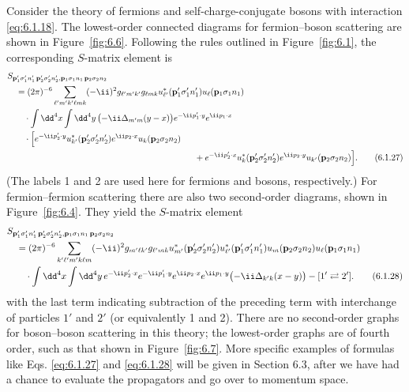 Consider the theory of fermions and self-charge-conjugate bosons with
interaction \eqref{eq:6.1.18}. The lowest-order connected diagrams for fermion--boson
scattering are shown in Figure~\ref{fig:6.6}. Following the rules outlined in Figure~\ref{fig:6.1},
the corresponding $S$-matrix element is
\begin{align}
&S_{\mathbf p'_1\sigma'_1n'_1\,\mathbf p'_2\sigma'_2n'_2,
       \mathbf p_1\sigma_1n_1\,\mathbf p_2\sigma_2n_2}
\notag\\
&\quad=(2\pi)^{-6}\sum_{\ell'm'k'\ell m k}
 (-\ii)^2 g_{\ell'm'k'}g_{\ell m k}
 u_{\ell'}^*(\mathbf p'_1\sigma'_1n'_1)
 u_\ell(\mathbf p_1\sigma_1n_1)
\notag\\
&\qquad\cdot\int \dd^4x\int \dd^4y\,
 \bigl(-\ii\Delta_{m'm}(y-x)\bigr)
 e^{-\ii p'_1\cdot y}e^{\ii p_1\cdot x}
\notag\\
&\qquad\cdot\Bigl[
 e^{-\ii p'_2\cdot y}u_{k'}^*(\mathbf p'_2\sigma'_2n'_2)
 e^{\ii p_2\cdot x}u_k(\mathbf p_2\sigma_2n_2)
\notag\\
&\hspace{77mm}+
 e^{-\ii p'_2\cdot x}u_k^*(\mathbf p'_2\sigma'_2n'_2)
 e^{\ii p_2\cdot y}u_{k'}(\mathbf p_2\sigma_2n_2)
 \Bigr].
\tag{6.1.27}
\label{eq:6.1.27}
\end{align}
(The labels 1 and 2 are used here for fermions and bosons, respectively.) For
fermion--fermion scattering there are also two second-order diagrams, shown in
Figure~\ref{fig:6.4}. They yield the $S$-matrix element
\begin{align}
&S_{\mathbf p'_1\sigma'_1n'_1\,\mathbf p'_2\sigma'_2n'_2,
       \mathbf p_1\sigma_1n_1\,\mathbf p_2\sigma_2n_2}
\notag\\
&\quad=(2\pi)^{-6}\sum_{k'\ell'm'k\ell m}
 (-\ii)^2g_{m'\ell k'}g_{\ell'mk}
 u_{m'}^*(\mathbf p'_2\sigma'_2n'_2)
 u_{\ell'}^*(\mathbf p'_1\sigma'_1n'_1)
 u_m(\mathbf p_2\sigma_2n_2)u_\ell(\mathbf p_1\sigma_1n_1)
\notag\\
&\qquad\cdot\int \dd^4x\int \dd^4y\,
 e^{-\ii p'_2\cdot x}e^{-\ii p'_1\cdot y}
 e^{\ii p_2\cdot x}e^{\ii p_1\cdot y}
 \bigl(-\ii\Delta_{k'k}(x-y)\bigr)
 -[1'\rightleftarrows2'].
\tag{6.1.28}
\label{eq:6.1.28}
\end{align}
with the last term indicating subtraction of the preceding term with
interchange of particles $1'$ and $2'$ (or equivalently 1 and 2). There are no
second-order graphs for boson--boson scattering in this theory; the
lowest-order graphs are of fourth order, such as that shown in Figure~\ref{fig:6.7}. More
specific examples of formulas like Eqs. \eqref{eq:6.1.27} and \eqref{eq:6.1.28} will be given in
Section 6.3, after we have had a chance to evaluate the propagators and go over
to momentum space.

